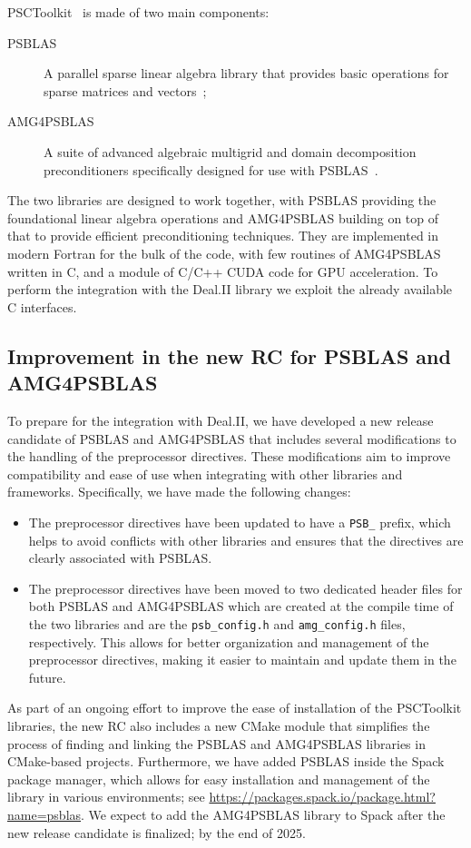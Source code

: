 \documentclass[a4paper,12pt]{article}
\begin{document}
PSCToolkit~\cite{PSCToolkit} is made of two main components:
\begin{description}
    \item[PSBLAS] A parallel sparse linear algebra library that provides basic operations for sparse matrices and vectors~\cite{PSBLAS};
    \item[AMG4PSBLAS] A suite of advanced algebraic multigrid and domain decomposition preconditioners specifically 
    designed for use with PSBLAS~\cite{AMG4PSBLAS}.
\end{description}
The two libraries are designed to work together, with PSBLAS providing the foundational linear algebra operations 
and AMG4PSBLAS building on top of that to provide efficient preconditioning techniques.
They are implemented in modern Fortran for the bulk of the code, with few routines of AMG4PSBLAS written in C,
and a module of C/C++ CUDA code for GPU acceleration. To perform the integration with the Deal.II library we 
exploit the already available C interfaces. 

\subsection{Improvement in the new RC for PSBLAS and AMG4PSBLAS}

To prepare for the integration with Deal.II, we have developed a new release candidate of PSBLAS and AMG4PSBLAS 
that includes several modifications to the handling of the preprocessor directives. These modifications aim 
to improve compatibility and ease of use when integrating with other libraries and frameworks.
Specifically, we have made the following changes:
\begin{itemize}
    \item The preprocessor directives have been updated to have a \verb|PSB_| prefix, which helps to 
    avoid conflicts with other libraries and ensures that the directives are clearly associated with PSBLAS.
    \item The preprocessor directives have been moved to two dedicated header files for both PSBLAS and AMG4PSBLAS
    which are created at the compile time of the two libraries and are the \verb|psb_config.h| and 
    \verb|amg_config.h| files, respectively. This allows for better organization and management of the 
    preprocessor directives, making it easier to maintain and update them in the future.
\end{itemize}

As part of an ongoing effort to improve the ease of installation of the PSCToolkit libraries, the new RC also 
includes a new CMake module that simplifies the process of finding and linking the PSBLAS and AMG4PSBLAS libraries
in CMake-based projects. Furthermore, we have added PSBLAS inside the Spack package manager, which allows for
easy installation and management of the library in various environments; see \url{https://packages.spack.io/package.html?name=psblas}.
We expect to add the AMG4PSBLAS library to Spack after the new release candidate is finalized; by the end of 2025.
\end{document}
